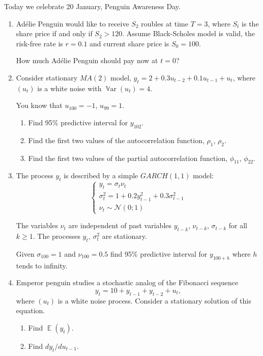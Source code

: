 \documentclass[12pt]{article}
\DeclareMathOperator{\E}{\mathbb{E}}
\DeclareMathOperator{\Var}{\mathbb{V}ar}
\newcommand{\cN}{\mathcal{N}}
\begin{document}
Today we celebrate 20 January, Penguin Awareness Day. 

\begin{enumerate}

    \item Adélie Penguin would like to receive $S_2$ roubles at time $T=3$,
    where $S_t$ is the share price if and only if $S_2 > 120$. Assume Black-Scholes model is valid, 
    the risk-free rate is $r=0.1$ and current share price is $S_0=100$.

    How much Adélie Penguin should pay now at $t=0$?
    
    \item Consider stationary $MA(2)$ model, $y_t = 2 + 0.3 u_{t-2} + 0.1 u_{t-1} + u_t$, where $(u_t)$ is a white noise
    with $\Var(u_t) = 4$.
    
    You know that $u_{100} = -1$, $u_{99} = 1$.
    \begin{enumerate}
        \item Find 95\% predictive interval for $y_{102}$.
        \item Find the first two values of the autocorrelation function, $\rho_1$, $\rho_2$.
        \item Find the first two values of the partial autocorrelation function, $\phi_{11}$, $\phi_{22}$.
    \end{enumerate}

    \item The process $y_t$ is described by a simple $GARCH(1, 1)$ model:
    \[ 
        \begin{cases}
            y_t = \sigma_t \nu_t \\
            \sigma_{t}^{2}= 1 + 0.2 y_{t-1}^{2}+ 0.3 \sigma_{t-1}^{2}    \\
            \nu_t \sim \cN(0;1)
        \end{cases}     
    \]

    The variables $\nu_t$ are independent of past variables $y_{t-k}$, $\nu_{t-k}$, $\sigma_{t-k}$ for all $k\geq 1$.
    The processes $y_t$, $\sigma^2_t$ are stationary. 


    Given $\sigma_{100}=1$ and $\nu_{100} = 0.5$ 
    find 95\% predictive interval for $y_{100+h}$ where $h$ tends to infinity. 


    \item Emperor penguin studies a stochastic analog of the Fibonacci sequence
    \[
        y_t = 10 + y_{t-1} + y_{t-2} + u_t,
    \]
    where $(u_t)$ is a white noise process. Consider a stationary solution of this equation. 
    \begin{enumerate}
        \item Find $\E(y_t)$.
        \item Find $dy_t/du_{t-1}$.
    \end{enumerate}


\end{enumerate}
\end{document}
